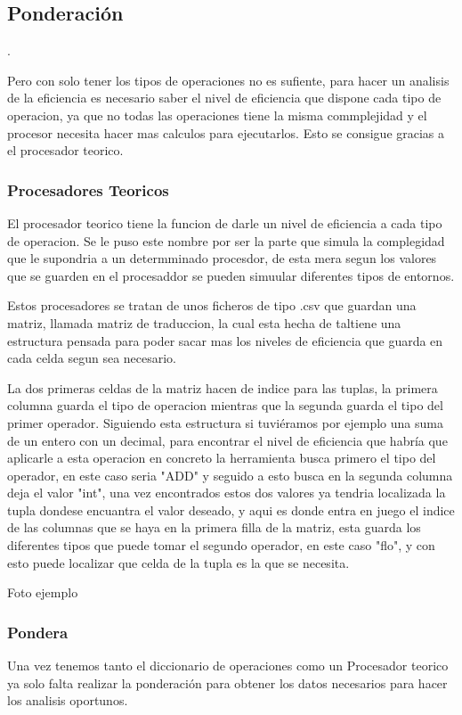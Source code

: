 \subsection{Ponderación}.

Pero con solo tener los tipos de operaciones no es sufiente, para hacer un analisis de la eficiencia es necesario saber el nivel de eficiencia que dispone cada tipo de operacion, ya que no todas las operaciones tiene la misma commplejidad y el procesor necesita hacer mas calculos para ejecutarlos. Esto se consigue gracias a el procesador teorico.

\subsubsection{Procesadores Teoricos}
El procesador teorico tiene la funcion de darle un nivel de eficiencia a cada tipo de operacion. Se le puso este nombre por ser la parte que simula la complegidad que le supondria a un determminado procesdor, de esta mera segun los valores que se guarden en el procesaddor se pueden simuular diferentes tipos de entornos.

Estos procesadores se tratan de unos ficheros de tipo .csv que guardan una matriz, llamada matriz de traduccion, la cual esta hecha de taltiene una estructura pensada para poder sacar mas los  niveles de eficiencia  que guarda en cada celda segun sea necesario.

La dos primeras celdas de la matriz hacen de indice para las tuplas, la primera columna guarda el tipo de operacion mientras que la segunda guarda el tipo del primer operador. Siguiendo esta estructura si tuviéramos por ejemplo una suma de un entero con un decimal, para encontrar el nivel de eficiencia que habría que aplicarle a esta operacion en concreto la herramienta busca primero el tipo del operador, en este caso seria "ADD" y seguido a  esto busca en la segunda columna deja el valor "int", una vez  encontrados  estos dos valores ya tendria localizada la tupla dondese encuantra  el valor  deseado, y aqui es donde  entra en juego el indice de las  columnas que se haya en la primera filla de la matriz, esta  guarda los diferentes tipos que puede tomar el segundo operador, en este caso "flo", y con esto puede localizar que celda de la tupla es la que se necesita.

Foto ejemplo

\subsubsection{Pondera}
Una vez tenemos tanto el diccionario de operaciones como un Procesador teorico ya solo falta realizar la ponderación para obtener los datos necesarios para hacer los analisis oportunos. 

